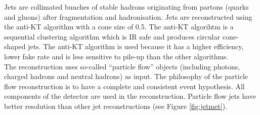 Jets are collimated bunches of stable hadrons originating from partons (quarks
and gluons) after fragmentation and hadronisation. Jets are reconstructed using 
the anti-KT algorithm with a cone size of 0.5. The anti-KT algorihtm is a
sequential clustering algorithm which is IR safe and produces circular
cone-shaped jets. The anti-KT algorithm is used because it has a higher 
efficiency, lower fake rate and is less sensitive to pile-up than the other 
algorithms. \\

The reconstruction uses so-called ``particle flow'' objects (including photons, 
charged hadrons and neutral hadrons) as input. The philosophy of the particle 
flow reconstruction is to have a complete and consistent event hypothesis. All 
components of the detector are used in the reconstruction. Particle flow jets 
have better resolution than other jet reconstructions (see Figure
\ref{fig:jetmet}).
